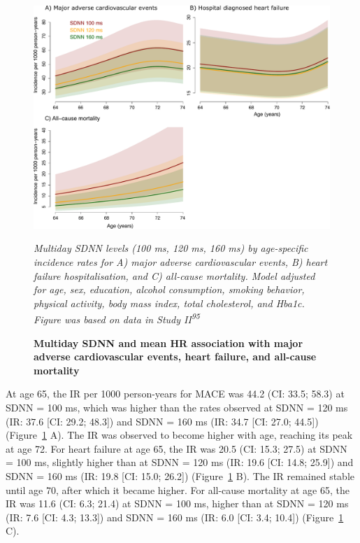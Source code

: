 \documentclass[
  a4paper,
  headsepline=true,
  open=left]{scrbook}
\begin{document}
\begin{figure}

{\centering 

\includegraphics{images/addition_pro_hrv_ir_mace.pdf}

\emph{Multiday SDNN levels (100 ms, 120 ms, 160 ms) by age-specific
incidence rates for A) major adverse cardiovascular events, B) heart
failure hospitalisation, and C) all-cause mortality. Model adjusted for
age, sex, education, alcohol consumption, smoking behavior, physical
activity, body mass index, total cholesterol, and Hba1c. Figure was
based on data in Study II\textsuperscript{95}}

}

\caption{\label{fig-addprohrv}\textbf{Multiday SDNN and mean HR
association with major adverse cardiovascular events, heart failure, and
all-cause mortality}}

\end{figure}

\restoregeometry

At age 65, the IR per 1000 person-years for MACE was 44.2 (CI: 33.5;
58.3) at SDNN = 100 ms, which was higher than the rates observed at SDNN
= 120 ms (IR: 37.6 {[}CI: 29.2; 48.3{]}) and SDNN = 160 ms (IR: 34.7
{[}CI: 27.0; 44.5{]}) (Figure~\ref{fig-addprohrv} A). The IR was
observed to become higher with age, reaching its peak at age 72. For
heart failure at age 65, the IR was 20.5 (CI: 15.3; 27.5) at SDNN = 100
ms, slightly higher than at SDNN = 120 ms (IR: 19.6 {[}CI: 14.8;
25.9{]}) and SDNN = 160 ms (IR: 19.8 {[}CI: 15.0; 26.2{]})
(Figure~\ref{fig-addprohrv} B). The IR remained stable until age 70,
after which it became higher. For all-cause mortality at age 65, the IR
was 11.6 (CI: 6.3; 21.4) at SDNN = 100 ms, higher than at SDNN = 120 ms
(IR: 7.6 {[}CI: 4.3; 13.3{]}) and SDNN = 160 ms (IR: 6.0 {[}CI: 3.4;
10.4{]}) (Figure~\ref{fig-addprohrv} C).
\end{document}
